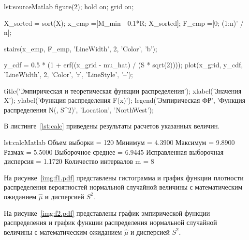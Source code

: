 \begin{listing}{lst:source}{Matlab}
figure(2);
hold on; grid on;

X_sorted = sort(X);
x_emp =[M_min - 0.1*R; X_sorted];
F_emp =[0; (1:n)' / n];

stairs(x_emp, F_emp, 'LineWidth', 2, 'Color', 'b');

y_cdf = 0.5 * (1 + erf((x_grid - mu_hat) / (S * sqrt(2))));
plot(x_grid, y_cdf, 'LineWidth', 2, 'Color', 'r', 'LineStyle', '--');

title('Эмпирическая и теоретическая функции распределения');
xlabel('Значения X');
ylabel('Функция распределения F(x)');
legend('Эмпирическая ФР', 'Функция распределения N(\mu, S^2)', 'Location', 'NorthWest');
\end{listing}

В листинге~\ref{lst:calc} приведены результаты расчетов указанных величин.
\begin{listing}{lst:calc}{Matlab}
Объем выборки           = 120
Минимум                 = 4.3900
Максимум                = 9.8900
Размах                  = 5.5000
Выборочное среднее      = 6.9445
Исправленная выборочная дисперсия = 1.1720
Количество интервалов m = 8
\end{listing}

На рисунке~\ref{img:f1.pdf} представлены гистограмма и график функции плотности 
распределения вероятностей нормальной случайной величины с математическим 
ожиданием \( \hat{\mu} \) и дисперсией \( S^2 \).


На рисунке~\ref{img:f2.pdf} представлены график эмпирической функции 
распределения и график функции распределения нормальной случайной величины 
с математическим ожиданием \( \hat{\mu} \) и дисперсией \( S^2 \).

